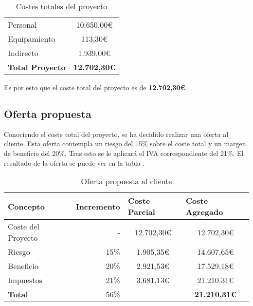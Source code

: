 \begin{table}[htbp]
    \centering
    \caption{Costes totales del proyecto}
    \label{tab:costes_totales}
    \begin{tabular}{@{}lc@{}}
    \toprule
    Personal                & 10.650,00\euro \\
    Equipamiento            & 113,30\euro    \\
    Indirecto               & 1.939,00\euro  \\ \midrule
    \textbf{Total Proyecto} & \textbf{12.702,30\euro} \\ \bottomrule
    \end{tabular}
    \end{table}

Es por esto que el coste total del proyecto es de \textbf{12.702,30\euro}.

\subsection{Oferta propuesta}\label{subsec:oferta_propuesta}

Conociendo el coste total del proyecto, se ha decidido realizar una oferta al cliente. Esta oferta contempla un riesgo del 15\% sobre el coste total y un margen de beneficio del 20\%. Tras esto se le aplicará el IVA correspondiente del 21\%. El resultado de la oferta se puede ver en la tabla .


\begin{table}[htbp]
    \centering
    \caption{Oferta propuesta al cliente}
    \label{tab:oferta_propuesta}
    \begin{tabular}{@{}lrcc@{}}
    \toprule
    \textbf{Concepto}  & \multicolumn{1}{l}{\textbf{Incremento}} & \multicolumn{1}{l}{\textbf{Coste Parcial}} & \multicolumn{1}{l}{\textbf{Coste Agregado}} \\ \midrule
    Coste del Proyecto & -                                       & 12.702,30\euro                                 & 12.702,30\euro                                  \\
    Riesgo             & 15\%                                    & 1.905,35\euro                                  & 14.607,65\euro                                  \\
    Beneficio          & 20\%                                    & 2.921,53\euro                                  & 17.529,18\euro                                  \\
    Impuestos          & 21\%                                    & 3.681,13\euro                                  & 21.210,31\euro                                  \\
    \textbf{Total}     & 56\%                                    &                                            & \textbf{21.210,31\euro}                         \\ \bottomrule
    \end{tabular}
    \end{table}
